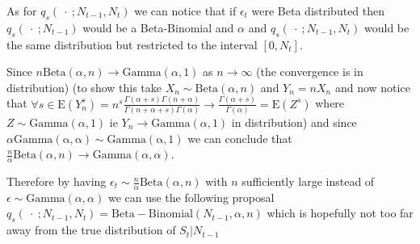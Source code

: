 \documentclass{article}
\begin{document}
	As for $q_s(\ \cdot \ ; N_{t-1}, N_t)$ we can notice that if $\epsilon_t$ were Beta distributed then $q_s(\ \cdot \ ; N_{t-1})$ would be a Beta-Binomial and $\alpha$ and $q_s(\ \cdot \ ; N_{t-1}, N_t)$ would be the same distribution but restricted to the interval $[0, N_t]$. 
	
	Since $n\mathrm{Beta}(\alpha, n) \rightarrow \mathrm{Gamma}(\alpha, 1)$ as $n \rightarrow \infty$ (the convergence is in distribution) (to show this take $X_n \sim \mathrm{Beta}(\alpha, n)$ and $Y_n = nX_n$ and now notice that $\forall s \in \mathrm{E}(Y_n^s) = n^s\frac{\Gamma(\alpha+s)\Gamma(n+\alpha)}{\Gamma(n+\alpha+s)\Gamma(\alpha)} \rightarrow \frac{\Gamma(\alpha+s)}{\Gamma(\alpha)} = \mathrm{E}(Z^s)$ where $Z \sim \mathrm{Gamma}(\alpha, 1)$ ie $Y_n \rightarrow \mathrm{Gamma}(\alpha, 1)$ in distribution) and since $\alpha\mathrm{Gamma(\alpha, \alpha) \sim \mathrm{Gamma}(\alpha, 1)}$ we can conclude that $\frac{n}{\alpha}\mathrm{Beta}(\alpha, n) \rightarrow \mathrm{Gamma}(\alpha, \alpha)$. 
	
	Therefore by having $\epsilon_t \sim \frac{n}{\alpha}\mathrm{Beta}(\alpha, n)$ with $n$ sufficiently large instead of $\epsilon \sim \mathrm{Gamma}(\alpha, \alpha)$ we can use the following proposal $q_s(\ \cdot \ ; N_{t-1}, N_t) = \mathrm{Beta-Binomial}(N_{t-1}, \alpha, n)$ which is hopefully not too far away from the true distribution of $S_t | N_{t-1}$
\end{document}
